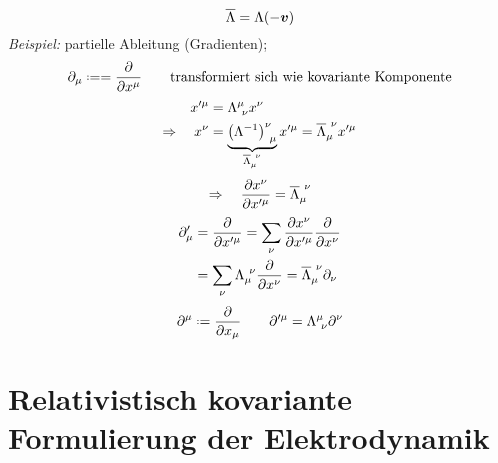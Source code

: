 \begin{equation*}
\overline{\Lambda} = \Lambda(- \bm{v})
\end{equation*}
\emph{Beispiel:} partielle Ableitung (Gradienten);
\begin{equation*}
\partial_{\mu} \defeq = \prt{}{x^{\mu}} \qquad \tx{transformiert sich wie kovariante Komponente}
\end{equation*}
\begin{align*}
x'^{\mu} &= \Lambda ^{\mu} _{\ \nu} x^{\nu} \\
\Rightarrow \quad x^{\nu} &= \ub{\left(\Lambda^{-1}\right)^{\nu}_{\ \mu}}_{\ol{\Lambda}_{\mu} ^{\ \nu}} x'^{\mu} = \ol{\Lambda}_{\mu} ^{\ \nu} x'^{\mu}
\end{align*}
\begin{equation*}
\Rightarrow \quad \frac{\partial x^{\nu}}{\partial x'^{\mu}} = \overline{\Lambda} _{\mu} ^{ \ \nu}
\end{equation*}
\begin{align*}
\partial '_{\mu} &= \frac{\partial }{\partial x'^{\mu}} = \sum_{\nu} \frac{\partial x^{\nu}}{\partial x'^{\mu}} \frac{\partial }{\partial x^{\nu}} \\
&= \sum_{\nu} \Lambda_{\mu}^{\ \nu} \frac{\partial }{\partial x^{\nu}} = \overline{\Lambda}_{\mu}^{\ \nu} \partial_{\nu}
\end{align*}
\begin{equation*}
\partial ^{\mu} \defeq \prt{}{x_{\mu}} \qquad \partial '^{\mu} = \Lambda^{\mu} _{\ \nu} \partial ^{\nu}
\end{equation*}

\section{Relativistisch kovariante Formulierung der Elektrodynamik}

